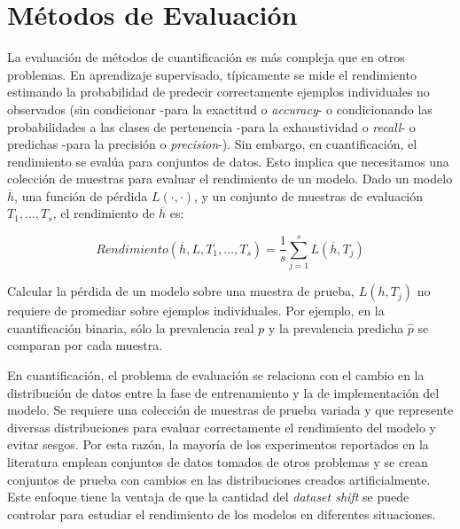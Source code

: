 \chapter{Métodos de Evaluación}\label{evaluacion}

La evaluación de métodos de cuantificación es más compleja que en otros
problemas. En aprendizaje supervisado, típicamente se mide el rendimiento
estimando la probabilidad de predecir correctamente ejemplos individuales no
observados (sin condicionar -para la exactitud o {\it accuracy\/}- o
condicionando las probabilidades a las clases de pertenencia -para la
exhaustividad o {\it recall\/}- o predichas -para la precisión o {\it
precision\/}-). Sin embargo, en cuantificación, el rendimiento se evalúa para
conjuntos de datos. Esto implica que necesitamos una colección de muestras para
evaluar el rendimiento de un modelo. Dado un modelo $\overline{h}$, una función
de pérdida $L(\cdot, \cdot)$, y un conjunto de muestras de evaluación ${T_1,
\dots, T_s}$, el rendimiento de $\overline{h}$ es:

\begin{equation}
    Rendimiento(\overline{h}, L, {T_1, \dots , T_s}) = \frac{1}{s}
    \sum \limits_{j=1}^{s}L(\overline{h}, T_j)
    \label{ecuacion_rendimiento}
\end{equation}

Calcular la pérdida de un modelo sobre una muestra de prueba, $L(\overline{h},
T_j)$ no requiere de promediar sobre ejemplos individuales. Por ejemplo, en la
cuantificación binaria, sólo la prevalencia real $p$ y la prevalencia predicha
$\hat{p}$ se comparan por cada muestra.

En cuantificación, el problema de evaluación se relaciona con el cambio en la
distribución de datos entre la fase de entrenamiento y la de implementación del
modelo. Se requiere una colección de muestras de prueba variada y que represente
diversas distribuciones para evaluar correctamente el rendimiento del modelo y
evitar sesgos. Por esta razón, la mayoría de los experimentos reportados en la
literatura emplean conjuntos de datos tomados de otros problemas y se crean
conjuntos de prueba con cambios en las distribuciones creados artificialmente.
Este enfoque tiene la ventaja de que la cantidad del {\it dataset shift\/} se
puede controlar para estudiar el rendimiento de los modelos en diferentes
situaciones.

